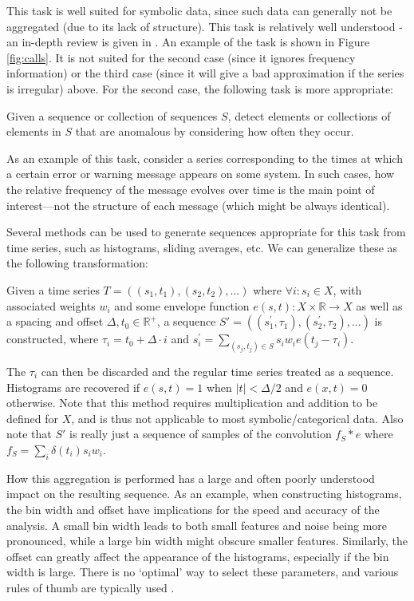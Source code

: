 This task is well suited for symbolic data, since such data can generally not be aggregated (due to its lack of structure). This task is relatively well understood - an in-depth review is given in \cite{chandola2}. An example of the task is shown in Figure \ref{fig:calls}. It is not suited for the second case (since it ignores frequency information) or the third case (since it will give a bad approximation if the series is irregular) above. For the second case, the following task is more appropriate:

\begin{task}
  \label{task:frequential_anomaly_detection}
  Given a sequence or collection of sequences $S$, detect elements or collections of elements in $S$ that are anomalous by considering how often they occur.
\end{task}

As an example of this task, consider a series corresponding to the times at which a certain error or warning message appears on some system. In such cases, how the relative frequency of the message evolves over time is the main point of interest---not the structure of each message (which might be always identical).

Several methods can be used to generate sequences appropriate for this task from time series, such as histograms, sliding averages, etc. We can generalize these as the following transformation:

Given a time series $T = ((s_1, t_1), (s_2, t_2), \dots)$ where $\forall i: s_i \in X$, with associated weights $w_i$ and some envelope function $e(s, t): X \times \mathbb{R} \rightarrow X$ as well as a spacing and offset $\Delta, t_0 \in \mathbb{R}^+$, a sequence $S' = ((s_{1}^{'}, \tau_1), (s_{2}^{'}, \tau_2), \dots)$ is constructed, where $\tau_i = t_0 + \Delta \cdot i$ and $s_{i}^{'} = \sum_{(s_j, t_j) \in S} s_i w_i e(t_j - \tau_i)$.

The $\tau_i$ can then be discarded and the regular time series treated as a sequence. Histograms are recovered if $e(s, t) = 1$ when $|t| < \Delta/2$ and $e(x, t) = 0$ otherwise. Note that this method requires multiplication and addition to be defined for $X$, and is thus not applicable to most symbolic/categorical data. Also note that $S'$ is really just a sequence of samples of the convolution $f_S \ast e$ where $f_S = \sum_i \delta(t_i) s_i w_i$.

How this aggregation is performed has a large and often poorly understood impact on the resulting sequence. As an example, when constructing histograms, the bin width and offset have implications for the speed and accuracy of the analysis. A small bin width leads to both small features and noise being more pronounced, while a large bin width might obscure smaller features. Similarly, the offset can greatly affect the appearance of the histograms, especially if the bin width is large. There is no `optimal' way to select these parameters, and various rules of thumb are typically used \cite{density_estimation}.

